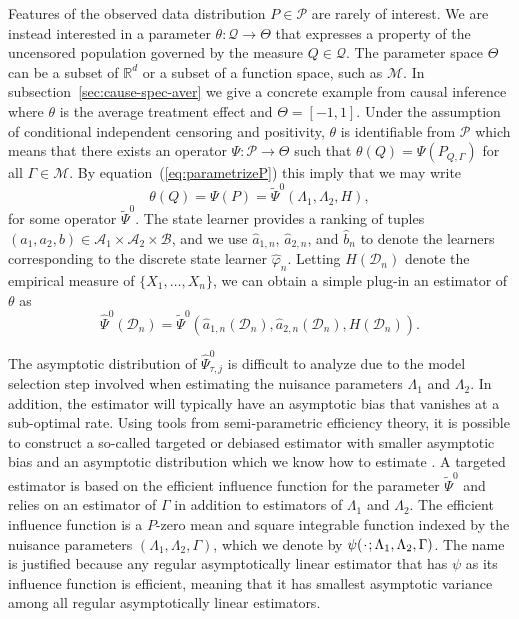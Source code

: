 \documentclass{statsoc}
\numberwithin{theorem}{section}
\newcommand{\R}{\mathbb{R}}
\newcommand{\blank}{\makebox[1ex]{\textbf{$\cdot$}}}
\renewcommand{\phi}{\varphi}
\newcommand{\1}{\mathds{1}}
\newcommand{\data}{\ensuremath{\mathcal{D}}}
\begin{document}
Features of the observed data distribution \( P \in \mathcal{P} \) are rarely of
interest. We are instead interested in a parameter
\( \theta \colon \mathcal{Q} \rightarrow \Theta \) that expresses a property of
the uncensored population governed by the measure \( Q \in \mathcal{Q} \). The
parameter space $\Theta$ can be a subset of \(\R^d\) or a subset of a function
space, such as \(\mathcal{M}\). In subsection~\ref{sec:cause-spec-aver} we give
a concrete example from causal inference where $\theta$ is the average treatment
effect and \( \Theta = [-1,1] \). Under the assumption of conditional
independent censoring and positivity, $\theta$ is identifiable from
\( \mathcal{P} \) which means that there exists an operator
\( \Psi \colon \mathcal{P} \rightarrow \Theta \) such that
\( \theta(Q) = \Psi(P_{Q, \Gamma}) \) for all $\Gamma \in \mathcal{M}$. By
equation~(\ref{eq:parametrizeP}) this imply that we may write
\begin{equation*}
  \theta(Q) = \Psi(P) = \tilde{\Psi}^0(\Lambda_1, \Lambda_2, H),
\end{equation*}
for some operator \( \tilde{\Psi}^0 \). The state learner provides a ranking of
tuples
\( (a_1, a_2, b) \in \mathcal{A}_1 \times \mathcal{A}_2 \times \mathcal{B} \),
and we use \( \hat{a}_{1,n} \), \( \hat{a}_{2,n} \), and \( \hat{b}_n \) to
denote the learners corresponding to the discrete state learner
\( \hat{\phi}_n \). Letting \( H(\data_n) \) denote the empirical measure of
\( \{X_1, \dots, X_n\} \), we can obtain a simple plug-in an estimator of
$\theta$ as
\begin{equation}
  \label{eq:2}
  \hat{\Psi}^0(\data_n) =
  \tilde{\Psi}^0(\hat{a}_{1,n}(\data_n), \hat{a}_{2,n}(\data_n), H(\data_n)). 
\end{equation}

The asymptotic distribution of \( \hat{\Psi}_{\tau, j}^0 \) is difficult to
analyze due to the model selection step involved when estimating the nuisance
parameters $\Lambda_1$ and $\Lambda_2$. In addition, the estimator will
typically have an asymptotic bias that vanishes at a sub-optimal rate. Using
tools from semi-parametric efficiency theory, it is possible to construct a
so-called targeted or debiased estimator with smaller asymptotic bias and an
asymptotic distribution which we know how to estimate
\citep{bickel1993efficient,van2011targeted,chernozhukov2018double}. A targeted
estimator is based on the efficient influence function for the parameter
$\tilde{\Psi}^0$ and relies on an estimator of $\Gamma$ in addition to
estimators of \( \Lambda_1 \) and $\Lambda_2$. The efficient influence function
is a \( P \)-zero mean and square integrable function indexed by the nuisance
parameters \( (\Lambda_1, \Lambda_2, \Gamma) \), which we denote by
\( \psi(\blank ; \Lambda_1, \Lambda_2, \Gamma) \). The name is justified because
any regular asymptotically linear estimator that has \( \psi \) as its influence
function is efficient, meaning that it has smallest asymptotic variance among
all regular asymptotically linear estimators.
\end{document}
